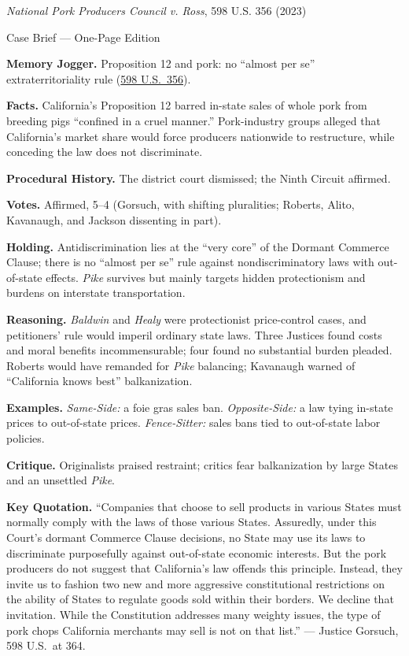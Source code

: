 \documentclass[12pt]{article}
\begin{document}
\begin{center}
{\Large \textit{National Pork Producers Council v. Ross}, 598 U.S. 356 (2023)\par}
\vspace{0.3em}
{\normalsize Case Brief --- One-Page Edition\par}
\end{center}

\textbf{Memory Jogger.} Proposition 12 and pork: no ``almost per se'' extraterritoriality rule (\href{https://www.law.cornell.edu/supremecourt/text/21-468}{598 U.S.\ 356}).

\textbf{Facts.} California's Proposition 12 barred in-state sales of whole pork from breeding pigs ``confined in a cruel manner.'' Pork-industry groups alleged that California's market share would force producers nationwide to restructure, while conceding the law does not discriminate.

\textbf{Procedural History.} The district court dismissed; the Ninth Circuit affirmed.

\textbf{Votes.} Affirmed, 5--4 (Gorsuch, with shifting pluralities; Roberts, Alito, Kavanaugh, and Jackson dissenting in part).

\textbf{Holding.} Antidiscrimination lies at the ``very core'' of the Dormant Commerce Clause; there is no ``almost per se'' rule against nondiscriminatory laws with out-of-state effects. \textit{Pike} survives but mainly targets hidden protectionism and burdens on interstate transportation.

\textbf{Reasoning.} \textit{Baldwin} and \textit{Healy} were protectionist price-control cases, and petitioners' rule would imperil ordinary state laws. Three Justices found costs and moral benefits incommensurable; four found no substantial burden pleaded. Roberts would have remanded for \textit{Pike} balancing; Kavanaugh warned of ``California knows best'' balkanization.

\textbf{Examples.} \emph{Same-Side:} a foie gras sales ban. \emph{Opposite-Side:} a law tying in-state prices to out-of-state prices. \emph{Fence-Sitter:} sales bans tied to out-of-state labor policies.

\textbf{Critique.} Originalists praised restraint; critics fear balkanization by large States and an unsettled \textit{Pike}.

\textbf{Key Quotation.} ``Companies that choose to sell products in various States must normally comply with the laws of those various States. Assuredly, under this Court's dormant Commerce Clause decisions, no State may use its laws to discriminate purposefully against out-of-state economic interests. But the pork producers do not suggest that California's law offends this principle. Instead, they invite us to fashion two new and more aggressive constitutional restrictions on the ability of States to regulate goods sold within their borders. We decline that invitation. While the Constitution addresses many weighty issues, the type of pork chops California merchants may sell is not on that list.'' --- Justice Gorsuch, 598 U.S.\ at 364.
\end{document}

